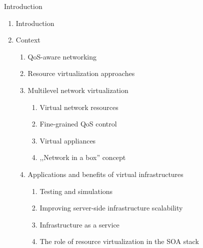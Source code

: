 \documentclass{beamer}
\begin{document}
\begin{frame}{Introduction}

	\begin{enumerate}

		\item Introduction \pause

		\item Context

			\begin{enumerate}
			
				\item QoS-aware networking \pause
				\item Resource virtualization approaches \pause
				\item Multilevel network virtualization
					
					\begin{enumerate}
						\item Virtual network resources
						\item Fine-grained QoS control
						\item Virtual appliances
						\item ,,Network in a box'' concept
					\end{enumerate}

					\pause

				\item Applications and benefits of virtual infrastructures

					\begin{enumerate}
						\item Testing and simulations
						\item Improving server-side infrastructure scalability
						\item Infrastructure as a service
						\item The role of resource virtualization in the SOA stack
					\end{enumerate}
			
			\end{enumerate}
	
	\end{enumerate}

\end{frame}

\setcounter{enumi_chapter}{\value{enumi}}
\end{document}
